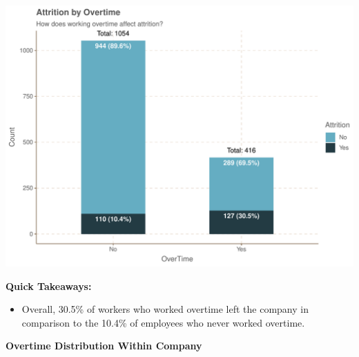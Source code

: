 \documentclass[
]{article}
\providecommand{\tightlist}{%
  \setlength{\itemsep}{0pt}\setlength{\parskip}{0pt}}
\begin{document}
\includegraphics{figures/unnamed-chunk-16-1.pdf}

\textbf{Quick Takeaways:}

\begin{itemize}
\tightlist
\item
  Overall, 30.5\% of workers who worked overtime left the company in
  comparison to the 10.4\% of employees who never worked overtime.
\end{itemize}

\textbf{Overtime Distribution Within Company}
\end{document}
